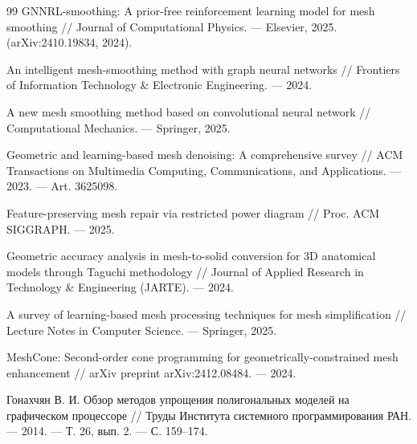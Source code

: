 \documentclass[a4paper,14pt]{article}
\begin{document}
\begin{thebibliography}{99}
 GNNRL-smoothing: A prior-free reinforcement learning model for mesh smoothing // Journal of Computational Physics. --- Elsevier, 2025. (arXiv:2410.19834, 2024).

 An intelligent mesh-smoothing method with graph neural networks // Frontiers of Information Technology \& Electronic Engineering. --- 2024.

 A new mesh smoothing method based on convolutional neural network // Computational Mechanics. --- Springer, 2025.

 Geometric and learning-based mesh denoising: A comprehensive survey // ACM Transactions on Multimedia Computing, Communications, and Applications. --- 2023. --- Art. 3625098.

 Feature-preserving mesh repair via restricted power diagram // Proc. ACM SIGGRAPH. --- 2025.

 Geometric accuracy analysis in mesh-to-solid conversion for 3D anatomical models through Taguchi methodology // Journal of Applied Research in Technology \& Engineering (JARTE). --- 2024.

 A survey of learning-based mesh processing techniques for mesh simplification // Lecture Notes in Computer Science. --- Springer, 2025.

 MeshCone: Second-order cone programming for geometrically-constrained mesh enhancement // arXiv preprint arXiv:2412.08484. --- 2024.

 Гонахчян В. И. Обзор методов упрощения полигональных моделей на графическом процессоре // Труды Института системного программирования РАН. --- 2014. --- Т. 26, вып. 2. --- С. 159--174.

\end{thebibliography}
\end{document}
